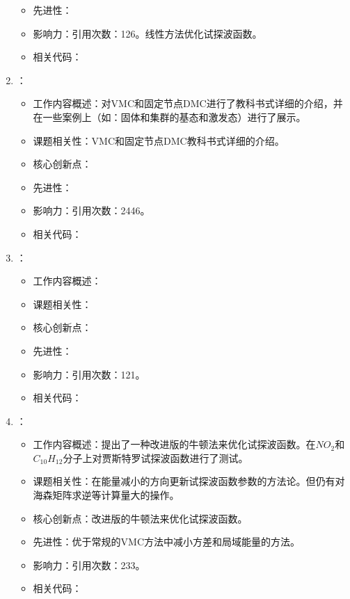 \begin{enumerate}
\begin{itemize}
            \item 先进性：
            \item 影响力：引用次数：126。线性方法优化试探波函数。
            \item 相关代码：
        \end{itemize}
        \item \citet{foulkes2001quantum}：
            \begin{itemize}
                \item 工作内容概述：对VMC和固定节点DMC进行了教科书式详细的介绍，并在一些案例上（如：固体和集群的基态和激发态）进行了展示。
                \item 课题相关性：VMC和固定节点DMC教科书式详细的介绍。
                \item 核心创新点：
                \item 先进性：
                \item 影响力：引用次数：2446。
                \item 相关代码：
            \end{itemize}
        \item \citet{casula2005diffusion}：
            \begin{itemize}
                \item 工作内容概述：
                \item 课题相关性：
                \item 核心创新点：
                \item 先进性：
                \item 影响力：引用次数：121。
                \item 相关代码：
            \end{itemize}
        \item \citet{umrigar2005energy}：
            \begin{itemize}
                \item 工作内容概述：提出了一种改进版的牛顿法来优化试探波函数。在$NO_2$和$C_{10}H_{12}$分子上对贾斯特罗试探波函数进行了测试。
                \item 课题相关性：在能量减小的方向更新试探波函数参数的方法论。但仍有对海森矩阵求逆等计算量大的操作。
                \item 核心创新点：改进版的牛顿法来优化试探波函数。
                \item 先进性：优于常规的VMC方法中减小方差和局域能量的方法。
                \item 影响力：引用次数：233。
                \item 相关代码：

\end{itemize}
\end{enumerate}
